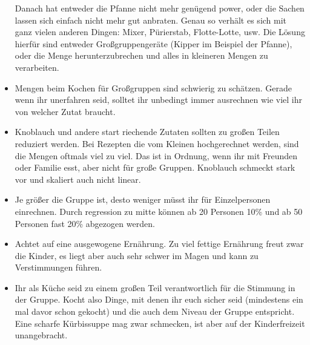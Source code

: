 \begin{itemize}
    Danach hat entweder die Pfanne nicht mehr genügend power, oder die Sachen lassen sich einfach nicht mehr gut anbraten.
    Genau so verhält es sich mit ganz vielen anderen Dingen: Mixer, Pürierstab, Flotte-Lotte, usw.
    Die Lösung hierfür sind entweder Großgruppengeräte (Kipper im Beispiel der Pfanne), oder die Menge herunterzubrechen und alles in kleineren Mengen zu verarbeiten.
    \item Mengen beim Kochen für Großgruppen sind schwierig zu schätzen.
    Gerade wenn ihr unerfahren seid, solltet ihr unbedingt immer ausrechnen wie viel ihr von welcher Zutat braucht.
    \item Knoblauch und andere start riechende Zutaten sollten zu großen Teilen reduziert werden.
    Bei Rezepten die vom Kleinen hochgerechnet werden, sind die Mengen oftmals viel zu viel.
    Das ist in Ordnung, wenn ihr mit Freunden oder Familie esst, aber nicht für große Gruppen.
    Knoblauch schmeckt stark vor und skaliert auch nicht linear.
    \item Je größer die Gruppe ist, desto weniger müsst ihr für Einzelpersonen einrechnen.
    Durch regression zu mitte können ab 20 Personen 10\% und ab 50 Personen fast 20\% abgezogen werden.
    \item Achtet auf eine ausgewogene Ernährung.
    Zu viel fettige Ernährung freut zwar die Kinder, es liegt aber auch sehr schwer im Magen und kann zu Verstimmungen führen.
    \item Ihr als Küche seid zu einem großen Teil verantwortlich für die Stimmung in der Gruppe.
    Kocht also Dinge, mit denen ihr euch sicher seid (mindestens ein mal davor schon gekocht) und die auch dem Niveau der Gruppe entspricht.
    Eine scharfe Kürbissuppe mag zwar schmecken, ist aber auf der Kinderfreizeit unangebracht.
\end{itemize}